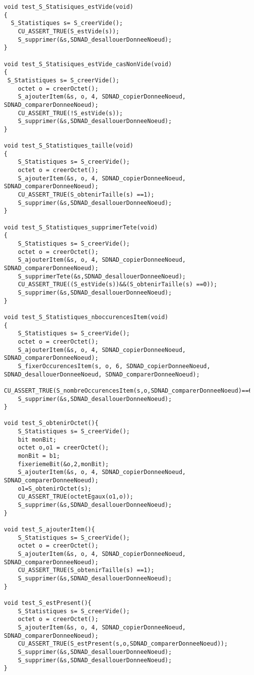 \begin{verbatim}
void test_S_Statisiques_estVide(void)
{
  S_Statistiques s= S_creerVide();
	CU_ASSERT_TRUE(S_estVide(s));
	S_supprimer(&s,SDNAD_desallouerDonneeNoeud);
}

void test_S_Statisiques_estVide_casNonVide(void)
{
 S_Statistiques s= S_creerVide();
	octet o = creerOctet();
	S_ajouterItem(&s, o, 4, SDNAD_copierDonneeNoeud, SDNAD_comparerDonneeNoeud);
	CU_ASSERT_TRUE(!S_estVide(s));
	S_supprimer(&s,SDNAD_desallouerDonneeNoeud);
}

void test_S_Statistiques_taille(void)
{
	S_Statistiques s= S_creerVide();
	octet o = creerOctet();
	S_ajouterItem(&s, o, 4, SDNAD_copierDonneeNoeud, SDNAD_comparerDonneeNoeud);
	CU_ASSERT_TRUE(S_obtenirTaille(s) ==1);
	S_supprimer(&s,SDNAD_desallouerDonneeNoeud);
}

void test_S_Statistiques_supprimerTete(void)
{
	S_Statistiques s= S_creerVide();
	octet o = creerOctet();
	S_ajouterItem(&s, o, 4, SDNAD_copierDonneeNoeud, SDNAD_comparerDonneeNoeud);
	S_supprimerTete(&s,SDNAD_desallouerDonneeNoeud);
	CU_ASSERT_TRUE((S_estVide(s))&&(S_obtenirTaille(s) ==0));
	S_supprimer(&s,SDNAD_desallouerDonneeNoeud);
}

void test_S_Statistiques_nboccurencesItem(void)
{
	S_Statistiques s= S_creerVide();
	octet o = creerOctet();
	S_ajouterItem(&s, o, 4, SDNAD_copierDonneeNoeud, SDNAD_comparerDonneeNoeud);
	S_fixerOccurencesItem(s, o, 6, SDNAD_copierDonneeNoeud, SDNAD_desallouerDonneeNoeud, SDNAD_comparerDonneeNoeud);
	CU_ASSERT_TRUE(S_nombreOccurencesItem(s,o,SDNAD_comparerDonneeNoeud)==6);
	S_supprimer(&s,SDNAD_desallouerDonneeNoeud);
}

void test_S_obtenirOctet(){
	S_Statistiques s= S_creerVide();
	bit monBit;
	octet o,o1 = creerOctet();
	monBit = b1;
	fixeriemeBit(&o,2,monBit);
	S_ajouterItem(&s, o, 4, SDNAD_copierDonneeNoeud, SDNAD_comparerDonneeNoeud);
	o1=S_obtenirOctet(s);
	CU_ASSERT_TRUE(octetEgaux(o1,o));
	S_supprimer(&s,SDNAD_desallouerDonneeNoeud);
}

void test_S_ajouterItem(){
	S_Statistiques s= S_creerVide();
	octet o = creerOctet();
	S_ajouterItem(&s, o, 4, SDNAD_copierDonneeNoeud, SDNAD_comparerDonneeNoeud);
	CU_ASSERT_TRUE(S_obtenirTaille(s) ==1);
	S_supprimer(&s,SDNAD_desallouerDonneeNoeud);
}

void test_S_estPresent(){
	S_Statistiques s= S_creerVide();
	octet o = creerOctet();
	S_ajouterItem(&s, o, 4, SDNAD_copierDonneeNoeud, SDNAD_comparerDonneeNoeud);
	CU_ASSERT_TRUE(S_estPresent(s,o,SDNAD_comparerDonneeNoeud));
	S_supprimer(&s,SDNAD_desallouerDonneeNoeud);
	S_supprimer(&s,SDNAD_desallouerDonneeNoeud);
}


\end{verbatim}
